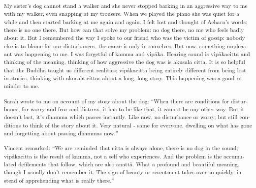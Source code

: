 \textsuperscript{\textenglish[variant=american]{My
sister}'\textenglish[variant=american]{s dog cannot stand a walker and
she never stopped barking in an aggressive way to me}\textdutch{ with my
walker}\textenglish[variant=american]{, even snapping at my trousers.
When we played the piano she was quiet for a while and then started
barking at me again and again. I felt lost and thought of
Acharn}'\textenglish[variant=american]{s words: there is no one there.
But how can that solve my problem: no dog there, no me who feels badly
about it. But I remembered the way I spoke to our friend who was the
victim of gossip: nobody else is to blame for our disturbances, the
cause is only in ourselves. But now, something unpleasant was happening
to me. I was forgetful of kamma and
vip}\textdutch{å}\textenglish[variant=american]{ka. Hearing sound is
vip}\textdutch{å}\textenglish[variant=american]{kacitta and thinking of
the meaning, thinking of how aggressive the dog was is akusala citta. It
is so helpful that the Buddha taught us different realities:
vip}\textdutch{å}\textenglish[variant=american]{kacitta being entirely
different from being lost in stories, thinking with akusala cittas about
a long, long story. This happening was a good reminder to me. }}

\textsuperscript{\textdutch{Sarah wrote to me on account of my story
about the dog: ``}\textenglish[variant=american]{When there are
conditions for disturbance, for worry and fear and distress, it has to
be like that, it cannot be any other way. But it doesn't last, it's
dhamma which passes instantly. Like now, no disturbance or worry, but
still conditions to think }\textdutch{of}\textenglish[variant=american]{
the story about it. Very natural - same for}\textdutch{
}\textenglish[variant=american]{everyone, dwelling on what has gone and
forgetting about passing dhammas now.}\textdutch{'' }}

\textsuperscript{V\textdutch{incent remarked:}
\textdutch{``}\textenglish[variant=american]{We are reminded that citta
is always alone, there is no dog in the sound;
vip}\textdutch{å}\textitalian{kacitta }\textdutch{is the
}\textenglish[variant=american]{result of kamma, not a self who
experiences. And the problem is the accumulated defilements that follow,
which are also anatt}\textdutch{å}\textenglish[variant=american]{. What
a profound and beautiful meaning, though I usually don't remember it.
The sign of beauty or resentment
take}\textdutch{s}\textenglish[variant=american]{ over so quickly,
instead of apprehending what is really there.}\textdutch{''}~}

